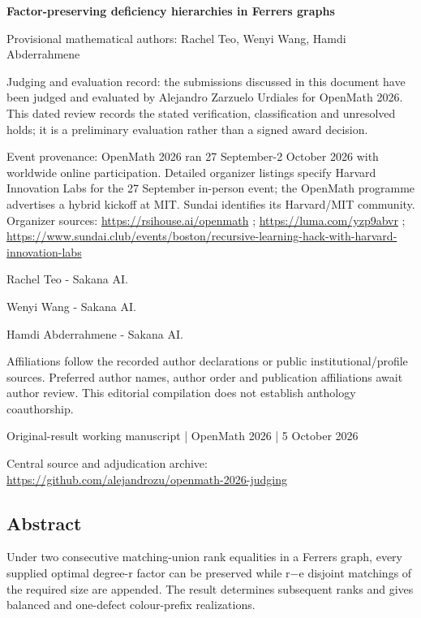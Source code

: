 \documentclass[11pt,a4paper]{article}
\begin{document}
{\LARGE\bfseries Factor-preserving deficiency hierarchies in Ferrers graphs\par}\medskip
{\small Provisional mathematical authors: Rachel Teo, Wenyi Wang, Hamdi Abderrahmene\par}\medskip
{\small Judging and evaluation record: the submissions discussed in this document have been judged and evaluated by Alejandro Zarzuelo Urdiales for OpenMath 2026. This dated review records the stated verification, classification and unresolved holds; it is a preliminary evaluation rather than a signed award decision.\par}

{\small Event provenance: OpenMath 2026 ran 27 September-2 October 2026 with worldwide online participation. Detailed organizer listings specify Harvard Innovation Labs for the 27 September in-person event; the OpenMath programme advertises a hybrid kickoff at MIT. Sundai identifies its Harvard/MIT community. Organizer sources: \url{https://rsihouse.ai/openmath} ; \url{https://luma.com/yzp9abvr} ; \url{https://www.sundai.club/events/boston/recursive-learning-hack-with-harvard-innovation-labs}\par}

{\small Rachel Teo  -  Sakana AI.\par}

{\small Wenyi Wang  -  Sakana AI.\par}

{\small Hamdi Abderrahmene  -  Sakana AI.\par}

{\small Affiliations follow the recorded author declarations or public institutional/profile sources. Preferred author names, author order and publication affiliations await author review. This editorial compilation does not establish anthology coauthorship.\par}

{\small Original-result working manuscript | OpenMath 2026 | 5 October 2026\par}\medskip
{\small Central source and adjudication archive: \url{https://github.com/alejandrozu/openmath-2026-judging}\par}

\subsection{Abstract}
Under two consecutive matching-union rank equalities in a Ferrers graph, every supplied optimal degree-r factor can be preserved while r\ensuremath{-}e disjoint matchings of the required size are appended. The result determines subsequent ranks and gives balanced and one-defect colour-prefix realizations.
\end{document}
